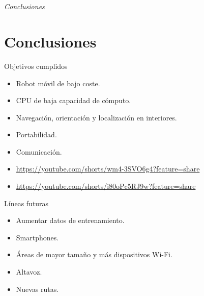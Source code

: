 \documentclass{beamer}
\begin{document}
\section*{}
\begin{frame}{}
  \centering \Huge
  \emph{Conclusiones}
\end{frame}


\section{Conclusiones}
\begin{frame}
\begin{block}{Objetivos cumplidos}
\begin{itemize}
\item Robot móvil de bajo coste.
\item CPU de baja capacidad de cómputo.
\item Navegación, orientación y localización en interiores.
\item Portabilidad.
\item Comunicación.
\end{itemize}

\begin{itemize}
\item \href{https://youtube.com/shorts/wm4-3SVO6g4?feature=share}{https://youtube.com/shorts/wm4-3SVO6g4?feature=share}
\item \href{https://youtube.com/shorts/i80oPc5RJ9w?feature=share}{https://youtube.com/shorts/i80oPc5RJ9w?feature=share}
\end{itemize} 

\end{block}

\end{frame}



\begin{frame}
\begin{block}{Líneas futuras}
\begin{itemize}
\item Aumentar datos de entrenamiento.
\item Smartphones.
\item Áreas de mayor tamaño y más dispositivos Wi-Fi.
\item Altavoz.
\item Nuevas rutas.
\end{itemize}
\end{block}
\end{frame}

\begin{frame}[plain]
\large{\titlepage}
\end{frame}
\end{document}
